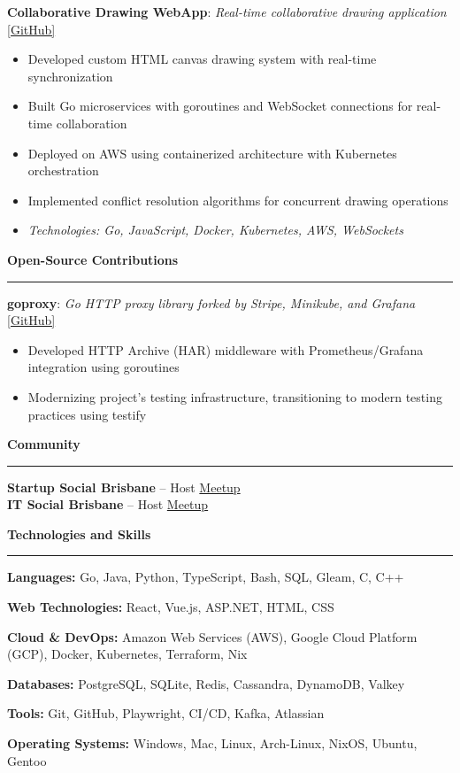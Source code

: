 \documentclass[9pt,a4paper]{extarticle}
\renewcommand{\section}[1]{%
	\vspace{2pt}%
	{\large\bfseries #1}\par\nobreak\vspace{-0.7em}%
	\rule{\linewidth}{0.4pt}\par\nobreak%
	\vspace{-2pt}%
}
\newenvironment{tightlist}{%
	\vspace{-3pt}%
	\begin{itemize}%
		\setlength{\leftmargin}{0pt}%
		\setlength{\itemindent}{0pt}%
		\setlength{\itemsep}{-2pt}%
		\setlength{\parsep}{0pt}%
		\setlength{\topsep}{0pt}%
		\setlength{\partopsep}{0pt}%
	}{%
	\end{itemize}%
	\vspace{-6pt}%
}
\begin{document}
	\textbf{Collaborative Drawing WebApp}: \textit{Real-time collaborative drawing application} \href{https://github.com/CameronBadman/Canvis-collab-webapp}{[GitHub]}
	\begin{tightlist}
		\item Developed custom HTML canvas drawing system with real-time synchronization
		\item Built Go microservices with goroutines and WebSocket connections for real-time collaboration
		\item Deployed on AWS using containerized architecture with Kubernetes orchestration
		\item Implemented conflict resolution algorithms for concurrent drawing operations
		\item \textit{Technologies: Go, JavaScript, Docker, Kubernetes, AWS, WebSockets}
	\end{tightlist}
	\section{Open-Source Contributions}
	\textbf{goproxy}: \textit{Go HTTP proxy library forked by Stripe, Minikube, and Grafana} \href{https://github.com/elazarl/goproxy}{[GitHub]}
	\begin{tightlist}
		\item Developed HTTP Archive (HAR) middleware with Prometheus/Grafana integration using goroutines
		\item Modernizing project's testing infrastructure, transitioning to modern testing practices using testify
	\end{tightlist}
	\section{Community}
	\textbf{Startup Social Brisbane} -- Host \hfill \href{https://www.meetup.com}{Meetup}\\
	\textbf{IT Social Brisbane} -- Host \hfill \href{https://www.meetup.com}{Meetup}
	\par\vspace{1pt}
	\section{Technologies and Skills}
	\textbf{Languages:} Go, Java, Python, TypeScript, Bash, SQL, Gleam, C, C++
	
	\textbf{Web Technologies:} React, Vue.js, ASP.NET, HTML, CSS
	
	\textbf{Cloud \& DevOps:} Amazon Web Services (AWS), Google Cloud Platform (GCP), Docker, Kubernetes, Terraform, Nix
	
	\textbf{Databases:} PostgreSQL, SQLite, Redis, Cassandra, DynamoDB, Valkey
	
	\textbf{Tools:} Git, GitHub, Playwright, CI/CD, Kafka, Atlassian
	
	\textbf{Operating Systems:} Windows, Mac, Linux, Arch-Linux, NixOS, Ubuntu, Gentoo
	
\end{document}
